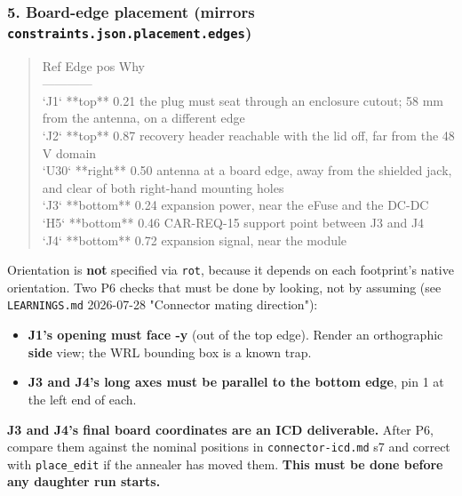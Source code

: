 \documentclass[11pt,a4paper]{article}
\begin{document}
\subsubsection*{5. Board-edge placement (mirrors \texttt{constraints.json.placement.edges})}
\begin{quote}\small\ttfamily\raggedright
\textbar{} Ref \textbar{} Edge \textbar{} pos \textbar{} Why \textbar{}\\
\textbar{}---\textbar{}---\textbar{}---\textbar{}---\textbar{}\\
\textbar{} `J1` \textbar{} {*}{*}top{*}{*} \textbar{} 0.21 \textbar{} the plug must seat through an enclosure cutout; 58 mm from the antenna, on a different edge \textbar{}\\
\textbar{} `J2` \textbar{} {*}{*}top{*}{*} \textbar{} 0.87 \textbar{} recovery header reachable with the lid off, far from the 48 V domain \textbar{}\\
\textbar{} `U30` \textbar{} {*}{*}right{*}{*} \textbar{} 0.50 \textbar{} antenna at a board edge, away from the shielded jack, and clear of both right-hand mounting holes \textbar{}\\
\textbar{} `J3` \textbar{} {*}{*}bottom{*}{*} \textbar{} 0.24 \textbar{} expansion power, near the eFuse and the DC-DC \textbar{}\\
\textbar{} `H5` \textbar{} {*}{*}bottom{*}{*} \textbar{} 0.46 \textbar{} CAR-REQ-15 support point between J3 and J4 \textbar{}\\
\textbar{} `J4` \textbar{} {*}{*}bottom{*}{*} \textbar{} 0.72 \textbar{} expansion signal, near the module \textbar{}
\end{quote}
Orientation is \textbf{not} specified via \texttt{rot}, because it depends on each footprint's native orientation. Two P6 checks that must be done by looking, not by assuming (see \texttt{LEARNINGS.md} 2026-07-28 "Connector mating direction"):

\begin{itemize}
\item \textbf{J1's opening must face -y} (out of the top edge). Render an orthographic \textbf{side} view; the
WRL bounding box is a known trap.
\item \textbf{J3 and J4's long axes must be parallel to the bottom edge}, pin 1 at the left end of each.
\end{itemize}
\textbf{J3 and J4's final board coordinates are an ICD deliverable.} After P6, compare them against the nominal positions in \texttt{connector-icd.md} s7 and correct with \texttt{place\_edit} if the annealer has moved them. \textbf{This must be done before any daughter run starts.}
\end{document}
